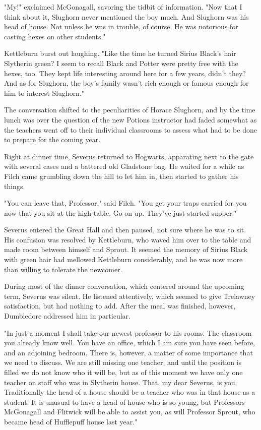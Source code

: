 \documentclass[a4paper,11pt]{article}
\begin{document}
"My!" exclaimed McGonagall, savoring the tidbit of information. "Now that I think about it, Slughorn never mentioned the boy much. And Slughorn was his head of house. Not unless he was in trouble, of course. He was notorious for casting hexes on other students."

Kettleburn burst out laughing. "Like the time he turned Sirius Black's hair Slytherin green? I seem to recall Black and Potter were pretty free with the hexes, too. They kept life interesting around here for a few years, didn't they? And as for Slughorn, the boy's family wasn't rich enough or famous enough for him to interest Slughorn."

The conversation shifted to the peculiarities of Horace Slughorn, and by the time lunch was over the question of the new Potions instructor had faded somewhat as the teachers went off to their individual classrooms to assess what had to be done to prepare for the coming year.

Right at dinner time, Severus returned to Hogwarts, apparating next to the gate with several cases and a battered old Gladstone bag. He waited for a while as Filch came grumbling down the hill to let him in, then started to gather his things.

"You can leave that, Professor," said Filch. "You get your traps carried for you now that you sit at the high table. Go on up. They've just started supper."

Severus entered the Great Hall and then paused, not sure where he was to sit. His confusion was resolved by Kettleburn, who waved him over to the table and made room between himself and Sprout. It seemed the memory of Sirius Black with green hair had mellowed Kettleburn considerably, and he was now more than willing to tolerate the newcomer.

During most of the dinner conversation, which centered around the upcoming term, Severus was silent. He listened attentively, which seemed to give Trelawney satisfaction, but had nothing to add. After the meal was finished, however, Dumbledore addressed him in particular.

"In just a moment I shall take our newest professor to his rooms. The classroom you already know well. You have an office, which I am sure you have seen before, and an adjoining bedroom. There is, however, a matter of some importance that we need to discuss. We are still missing one teacher, and until the position is filled we do not know who it will be, but as of this moment we have only one teacher on staff who was in Slytherin house. That, my dear Severus, is you. Traditionally the head of a house should be a teacher who was in that house as a student. It is unusual to have a head of house who is so young, but Professors McGonagall and Flitwick will be able to assist you, as will Professor Sprout, who became head of Hufflepuff house last year."
\end{document}
